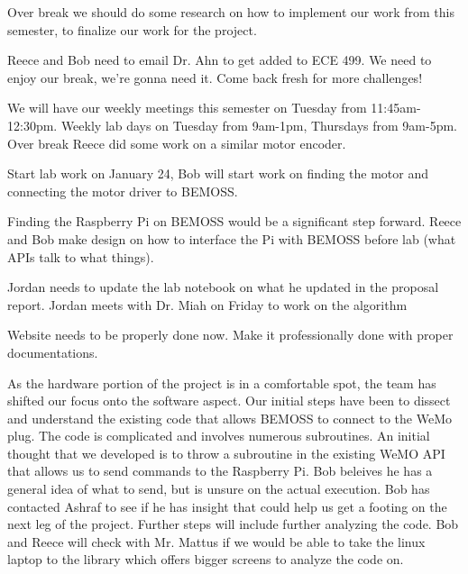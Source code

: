 \documentclass[fontsize=11pt, %
                             paper=letter, %
                             twoside, %
                             captions=tableheading,
                             index=totoc,
                             hyperref]{labbook}
\begin{document}
Over break we should do some research on how to implement our work from this semester, to finalize our work for the project.

Reece and Bob need to email Dr. Ahn to get added to ECE 499.
We need to enjoy our break, we're gonna need it.
Come back fresh for more challenges!

We will have our weekly meetings this semester on Tuesday from 11:45am-12:30pm.
Weekly lab days on Tuesday from 9am-1pm, Thursdays from 9am-5pm.
Over break Reece did some work on a similar motor encoder.

Start lab work on January 24, Bob will start work on finding the motor and connecting the motor driver to BEMOSS.

Finding the Raspberry Pi on BEMOSS would be a significant step forward. 
Reece and Bob make design on how to interface the Pi with BEMOSS before lab (what APIs talk to what things). 

Jordan needs to update the lab notebook on what he updated in the proposal report. Jordan meets with Dr. Miah on Friday to work on the algorithm 

Website needs to be properly done now. Make it professionally done with proper documentations. 

As the hardware portion of the project is in a comfortable spot, the team has shifted our focus onto the software aspect. Our initial steps have been to dissect and understand the existing code that allows BEMOSS to connect to the WeMo plug. The code is complicated and involves numerous subroutines. An initial thought that we developed is to throw a subroutine in the existing WeMO API that allows us to send commands to the Raspberry Pi. Bob beleives he has a general idea of what to send, but is unsure on the actual execution. Bob has contacted Ashraf to see if he has insight that could help us get a footing on the next leg of the project. Further steps will include further analyzing the code. Bob and Reece will check with Mr. Mattus if we would be able to take the linux laptop to the library which offers bigger screens to analyze the code on. 
\end{document}
